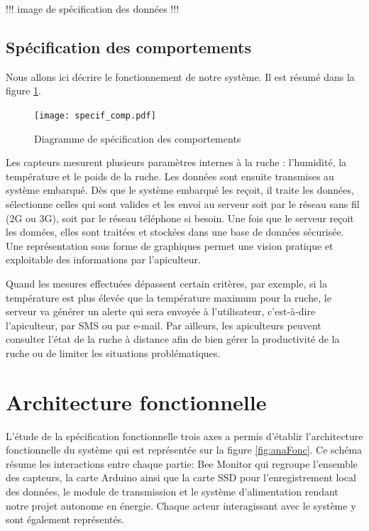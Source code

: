 !!!  image de spécification des données  !!!

\section{Spécification des comportements}

Nous allons ici décrire le fonctionnement de notre système. Il est résumé dans la figure \ref{fig:sp_comp}.

\begin{figure}[h!]
\centering\texttt{[image: specif\_comp.pdf]}
\caption{\label{fig:sp_comp} Diagramme de spécification des comportements}
\end{figure}

Les capteurs mesurent plusieurs paramètres internes à la ruche : l'humidité, la température et le poids de la ruche. Les données sont ensuite transmises au système embarqué. Dès que le système embarqué les reçoit, il traite les données, sélectionne celles qui sont valides et les envoi au serveur soit par le réseau sans fil (2G ou 3G), soit par le réseau téléphone si besoin. Une fois que le serveur reçoit les données, elles sont traitées et stockées dans une base de données sécurisée. Une représentation sous forme de graphiques permet une vision pratique et exploitable des informations par l'apiculteur.

Quand les mesures effectuées dépassent certain critères, par exemple, si la température est plus élevée que la température maximum pour la ruche, le serveur va générer un alerte qui sera envoyée à l'utilisateur, c’est-à-dire l'apiculteur, par SMS ou par e-mail. Par ailleurs, les apiculteurs peuvent consulter l’état de la ruche à distance afin de bien gérer la productivité de la ruche ou de limiter les situations problématiques. 

\pagebreak

\chapter{Architecture fonctionnelle}

L'étude de la spécification fonctionnelle trois axes a permis d'établir l'architecture fonctionnelle du système qui est représentée sur la figure \ref{fig:anaFonc}.
Ce schéma résume les interactions entre chaque partie: Bee Monitor qui regroupe l'ensemble des capteurs, la carte Arduino ainsi que la carte SSD pour l'enregistrement local des données, le module de transmission et le système d'alimentation rendant notre projet autonome en énergie. Chaque acteur interagissant avec le système y sont également représentés. 
  

